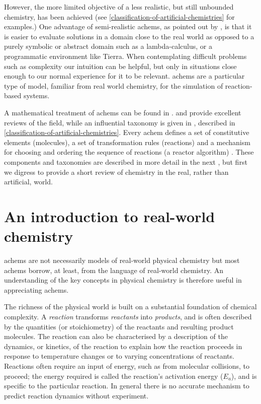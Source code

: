 However, the more limited objective of a less realistic, but still unbounded chemistry, has been achieved (see \cref{classification-of-artificial-chemistries} for examples.) One advantage of semi-realistic \glspl{achem}, as pointed out by \textcite[5]{Funes2001}, is that it is easier to evaluate solutions in a domain close to the real world as opposed to a purely symbolic or abstract domain such as a lambda-calculus, or a programmatic environment like Tierra. When contemplating difficult problems such as complexity our intuition can be helpful, but only in situations close enough to our normal experience for it to be relevant. \Glspl{achem} are a particular type of model, familiar from real world chemistry, for the simulation of reaction-based systems. 

A mathematical treatment of \glspl{achem} can be found in \textcite{Benko2009}. \Textcite{Dittrich:2001zr} and \textcite{Suzuki2008a} provide excellent reviews of the field, while an influential taxonomy is given in \textcite{Dittrich:2001zr}, described in \cref{classification-of-artificial-chemistries}. Every \gls{achem} defines a set of constitutive elements (molecules), a set of transformation rules (reactions) and a mechanism for choosing and ordering the sequence of reactions (a reactor algorithm) \parencite{Dittrich:2001zr}. These components and taxonomies are described in more detail in the next , but first we digress to provide a short review of chemistry in the real, rather than artificial, world.

\section{An introduction to real-world chemistry}\label{sec:real-world-chemistry}

\Glspl{achem} are not necessarily models of real-world physical chemistry but most \glspl{achem} borrow, at least, from the language of real-world chemistry. An understanding of the key concepts in physical chemistry is therefore useful in appreciating \glspl{achem}.

The richness of the physical world is built on a substantial foundation of chemical complexity. A \textit{reaction} transforms \emph{reactants} into \emph{products}, and is often described by the quantities (or stoichiometry) of the reactants and resulting product molecules. The reaction can also be characterised by a description of the dynamics, or kinetics, of the reaction to explain how the reaction proceeds in response to temperature changes or to varying concentrations of reactants. Reactions often require an input of energy, such as from molecular collisions, to proceed; the energy required is called the reaction's activation energy (\(E_a\)), and is specific to the particular reaction. In general there is no accurate mechanism to predict reaction dynamics without experiment.

